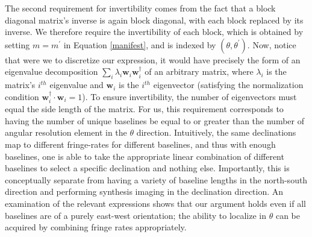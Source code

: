 \documentclass[twocolumn,apj,numberedappendix]{emulateapj}
\begin{document}
The second requirement for invertibility comes from the fact that a block
diagonal matrix's inverse is again block diagonal, with each block replaced by
its inverse.  We therefore require the invertibility of each block, which is
obtained by setting $m=m^\prime$ in Equation \eqref{manifest}, and is indexed
by $(\theta, \theta^\prime)$.  Now, notice that were we to discretize our
expression, it would have precisely the form of an eigenvalue decomposition
$\sum_i \lambda_i \mathbf{w}_i \mathbf{w}_i^\dagger$ of an arbitrary matrix,
where $\lambda_i$ is the matrix's $i^{th}$ eigenvalue and $\mathbf{w}_i$ is the
$i^{th}$ eigenvector (satisfying the normalization condition
$\mathbf{w}_i^\dagger \cdot \mathbf{w}_i = 1$).  To ensure invertibility, the
number of eigenvectors must equal the side length of the matrix.  For us, this
requirement corresponds to having the number of unique baselines be equal to or
greater than the number of angular resolution element in the $\theta$
direction.  Intuitively, the same declinations map to different fringe-rates
for different baselines, and thus with enough baselines, one is able to take
the appropriate linear combination of different baselines to select a specific
declination and nothing else.  Importantly, this is conceptually separate from
having a variety of baseline lengths in the north-south direction and
performing synthesis imaging in the declination direction.  An examination of
the relevant expressions shows that our argument holds even if all baselines
are of a purely east-west orientation; the ability to localize in $\theta$ can
be acquired by combining fringe rates appropriately.
\end{document}
